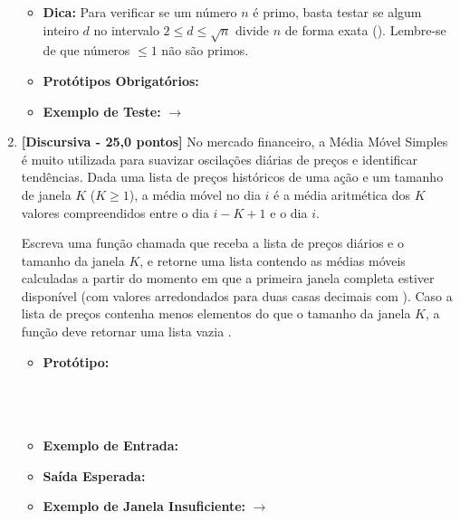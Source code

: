 \begin{enumerate}[label=\textbf{Q\arabic*.}, start=1]
\begin{itemize}[leftmargin=*]
    \item \textbf{Dica:} Para verificar se um número $n$ é primo, basta testar se algum inteiro $d$ no intervalo $2 \le d \le \sqrt{n}$ divide $n$ de forma exata (). Lembre-se de que números $\le 1$ não são primos.
    \item \textbf{Protótipos Obrigatórios:}\newline
    \newline
    \newline
    \item \textbf{Exemplo de Teste:}  $\rightarrow$ \code{[11, 13, 17, 19, 23, 29]}
\end{itemize}



\vspace{0.5cm}

\item \textbf{[Discursiva - 25,0 pontos]} No mercado financeiro, a Média Móvel Simples é muito utilizada para suavizar oscilações diárias de preços e identificar tendências. Dada uma lista de preços históricos de uma ação e um tamanho de janela $K$ ($K \ge 1$), a média móvel no dia $i$ é a média aritmética dos $K$ valores compreendidos entre o dia $i - K + 1$ e o dia $i$.

Escreva uma função chamada  que receba a lista de preços diários e o tamanho da janela $K$, e retorne uma lista contendo as médias móveis calculadas a partir do momento em que a primeira janela completa estiver disponível (com valores arredondados para duas casas decimais com ). Caso a lista de preços contenha menos elementos do que o tamanho da janela $K$, a função deve retornar uma lista vazia \code{[]}.

\begin{itemize}[leftmargin=*]
    \item \textbf{Protótipo:}\newline {}\\\\\\\\
    \item \textbf{Exemplo de Entrada:} 
    \item \textbf{Saída Esperada:} \code{[102.0, 104.0, 106.0]}
    \item \textbf{Exemplo de Janela Insuficiente:}  $\rightarrow$ \code{[]}
\end{itemize}



\end{enumerate}

